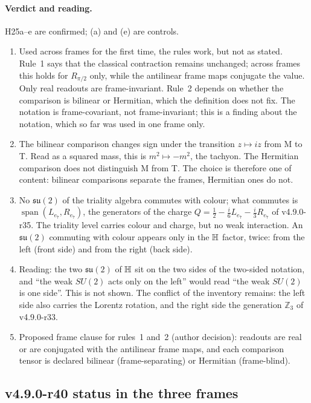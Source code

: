 \paragraph{Verdict and reading.}
H25a--e are confirmed; (a) and (e) are controls.
\begin{enumerate}[leftmargin=2em]
\item Used across frames for the first time, the rules work, but not as stated.  Rule~1 says that the classical contraction remains
unchanged; across frames this holds for \(R_{\pi/2}\) only, while the antilinear frame maps conjugate the value.  Only real readouts are
frame-invariant.  Rule~2 depends on whether the comparison is bilinear or Hermitian, which the definition does not fix.  The notation
is frame-covariant, not frame-invariant; this is a finding about the notation, which so far was used in one frame only.
\item The bilinear comparison changes sign under the transition \(z\mapsto iz\) from M to T.  Read as a squared mass, this is
\(m^2\mapsto-m^2\), the tachyon.  The Hermitian comparison does not distinguish M from T.  The choice is therefore one of content:
bilinear comparisons separate the frames, Hermitian ones do not.
\item No \(\mathfrak{su}(2)\) of the triality algebra commutes with colour; what commutes is \(\operatorname{span}(L_{e_7},R_{e_7})\), the
generators of the charge \(Q=\tfrac12-\tfrac{i}{6}L_{e_7}-\tfrac{i}{3}R_{e_7}\) of v4.9.0-r35.  The triality level carries colour and
charge, but no weak interaction.  An \(\mathfrak{su}(2)\) commuting with colour appears only in the \(\mathbb{H}\) factor, twice: from the left
(front side) and from the right (back side).
\item Reading: the two \(\mathfrak{su}(2)\) of \(\mathbb{H}\) sit on the two sides of the two-sided notation, and ``the weak \(SU(2)\) acts only
on the left'' would read ``the weak \(SU(2)\) is one side''.  This is not shown.  The conflict of the inventory remains: the left side
also carries the Lorentz rotation, and the right side the generation \(\mathbb Z_3\) of v4.9.0-r33.
\item Proposed frame clause for rules~1 and~2 (author decision): readouts are real or are conjugated with the antilinear frame maps,
and each comparison tensor is declared bilinear (frame-separating) or Hermitian (frame-blind).
\end{enumerate}

\subsection*{v4.9.0-r40 status in the three frames}
\label{subsec:v490-r40-frames}

